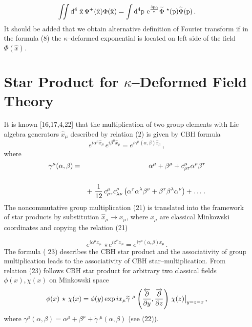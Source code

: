 \documentclass[a4paper,a4paper]{article}
\newcommand\D{\rm d }
\begin{document}
\begin{equation}
\int\!\!\!\int \D^{4}\  \hat{x} \, \Phi^{+}(\hat{x})  \Phi(\hat{x}) 
     =
     \int\D^{4} p\
e^{3p_{0}\over \kappa} 
    \widetilde{\Phi}\ ^{\star}(p)
 \widetilde{ \Phi}(p) \, .
 \end{equation}
 \renewcommand{\theequation}{\arabic{equation}}
\setcounter{equation}{20}
     It should be added that we obtain alternative definition of
Fourier transform if in the formula (8) the $\kappa$--deformed
exponential is located on left side of the field $ \Phi(\hat{x})$.


\section{Star Product for $\kappa$--Deformed Field Theory}

It is known [16,17,4,22] that the multiplication of two group     
 elements with Lie algebra generators $\hat{x}_{\mu}$ described
by relation (2) is given by CBH formula
\begin{equation}
e^{i \alpha^{\mu}\hat{x}_{\mu}} \, 
e^{i \beta^{\mu}\hat{x}_{\mu} } =
e^{i \gamma ^{\mu} (\alpha,\beta) \hat{x}_{\mu}}\, ,
     \end{equation}
     where
\begin{eqnarray}
 \gamma^{\mu} (\alpha,\beta) &=&
 \alpha^{\mu} + \beta^{\mu} + c^{\mu}_{\rho\tau}
 \alpha^{\rho}\beta^{\tau} 
 \cr\cr
&&  + \ {1\over 12} \, c^{\mu}_{\rho\tau}      c^{\rho}_{\lambda\nu}
     \left(
     \alpha^{\tau}\alpha^{\lambda} \beta^{\nu} +
     \beta^{\tau} \beta^{\lambda} \alpha^{\nu} \right) +
\ldots\, .
     \end{eqnarray}
     The noncommutative group multiplication (21) is translated
into the framework of star products by substitution 
$\hat{x}_{\mu} \to x_{\mu}$, where $x_{\mu}$ are classical
Minkowski coordinates and copying the relation (21)

\begin{equation}
e^{i \alpha^{\mu} {x}_{\mu} } \, \star 
e^{i \beta ^{\mu}{x}_{\mu} } =
e^{i \gamma ^{\mu} (\alpha,\beta) {x}_{\mu} }\, .
     \end{equation}     
The formula ( 23) describes the CBH star product and the
associativity of group multiplication leads to the associativity
of CBH star--multiplication. From relation  (23) follows CBH
star product for arbitrary two classical fields $\phi(x),
\chi(x)$ on Minkowski space
\begin{equation}
\phi(x)\,  \star\,  \chi(x) =
\phi(y) \, \hbox{exp}\, i x_{\mu} {\widetilde{\gamma}}\ ^{\mu} 
\left( { \overleftarrow{\partial} \over \partial y} , 
{  \overrightarrow{\partial} 
 \over \partial z} \right) \, \chi(z)\big|_{y=z=x} \, ,
 \end{equation}
 where $ {{\gamma}} ^{\mu} (\alpha,\beta)=
 \alpha^{\mu} + \beta^{\mu} +
  {\widetilde{\gamma}}\ ^{\mu} (\alpha, \beta)$ (see (22)).
\end{document}
